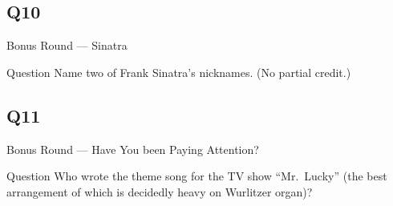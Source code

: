 \documentclass[11pt]{beamer}
\begin{document}
\subsection*{Q10}
\begin{frame}[t]{Bonus Round --- Sinatra}
\vspace{-0.5em}
\begin{block}{Question}
Name two of Frank Sinatra's nicknames. (No partial credit.)
\end{block}
\end{frame}
\subsection*{Q11}
\begin{frame}[t]{Bonus Round --- Have You been Paying Attention?}
\vspace{-0.5em}
\begin{block}{Question}
Who wrote the theme song for the TV show ``Mr.\ Lucky'' (the best arrangement of which is decidedly heavy on Wurlitzer organ)?
\end{block}
\end{frame}
\end{document}
